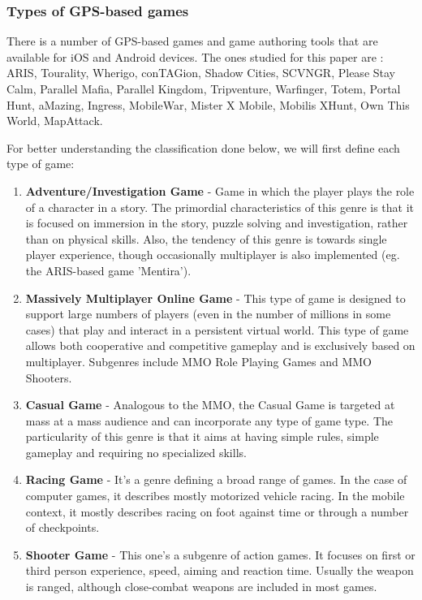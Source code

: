\documentclass{article}
\begin{document}
\subsubsection{Types of GPS-based games}

There is a number of GPS-based games and game authoring tools that are
available for iOS and Android devices. The ones studied for this paper are :
ARIS, Tourality, Wherigo, conTAGion, Shadow Cities, SCVNGR, Please Stay Calm,
Parallel Mafia, Parallel Kingdom, Tripventure, Warfinger, Totem, Portal Hunt,
aMazing, Ingress, MobileWar, Mister X Mobile, Mobilis XHunt, Own This World,
MapAttack.\newline

For better understanding the classification done below, we will first define
each type of game:

\begin{enumerate}
  \item \textbf{Adventure/Investigation Game} - Game in which the player plays
  the role of a character in a story. The primordial characteristics of this
  genre is that it is focused on immersion in the story, puzzle solving and
  investigation, rather than on physical skills. Also, the tendency of this
  genre is towards single player experience, though occasionally multiplayer is
  also implemented (eg. the ARIS-based game 'Mentira').
  
  \item \textbf{Massively Multiplayer Online Game} - This type of game is
  designed to support large numbers of players (even in the number of millions
  in some cases) that play and interact in a persistent virtual world. This type
  of game allows both cooperative and competitive gameplay and is exclusively
  based on multiplayer. Subgenres include MMO Role Playing Games and
  MMO Shooters.
  
  \item \textbf{Casual Game} - Analogous to the MMO, the Casual Game is targeted
  at mass at a mass audience and can incorporate any type of game type. The
  particularity of this genre is that it aims at having simple rules, simple
  gameplay and requiring no specialized skills. 
  
  \item \textbf{Racing Game} - It's a genre defining a broad range of games. In
  the case of computer games, it describes mostly motorized vehicle racing. In
  the mobile context, it mostly describes racing on foot against time or through
  a number of checkpoints.
  
  \item \textbf{Shooter Game} - This one's a subgenre of action games. It
  focuses on first or third person experience, speed, aiming and reaction time.
  Usually the weapon is ranged, although close-combat weapons are included in
  most games.
  
\end{enumerate}
\end{document}
